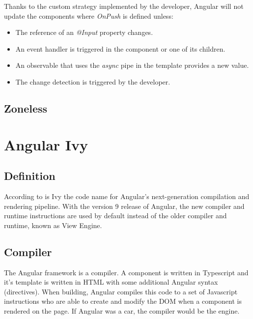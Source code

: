 Thanks to the custom strategy implemented by the developer, Angular will not update the components where \emph{OnPush} is defined unless:
\begin{itemize}
    \item The reference of an \emph{@Input} property changes.
    \item An event handler is triggered in the component or one of its children.
    \item An observable that uses the \emph{async} pipe in the template provides a new value.
    \item The change detection is triggered by the developer.
\end{itemize}
\subsection{Zoneless}

\section{Angular Ivy}
\subsection{Definition}
According to \textcite{Angular.io-ivy} is Ivy the code name for Angular's next-generation compilation and rendering pipeline. With the version 9 release of Angular, the new compiler and runtime instructions are used by default instead of the older compiler and runtime, known as View Engine.

\subsection{Compiler}
The Angular framework is a compiler. A component is written in Typescript and it's template is written in HTML with some additional Angular syntax (directives). When building, Angular compiles this code to a set of Javascript instructions who are able to create and modify the DOM when a component is rendered on the page. If Angular was a car, the compiler would be the engine.

